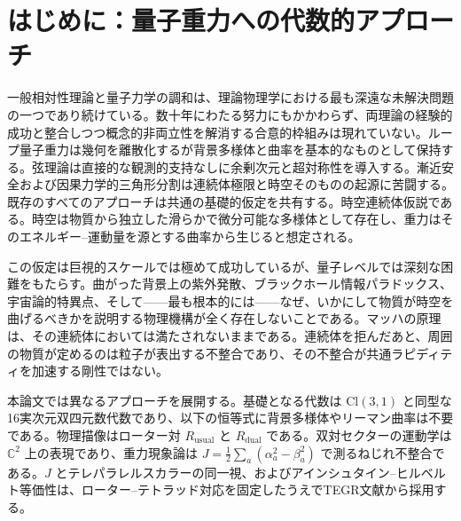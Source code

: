 \documentclass[a4paper]{article}
\begin{document}
\begin{abstract}
代数は動力学を定めない。等スケールの干渉節は内向きに並び、ボーア半径を再現しない。双対ローターの一周は、どの半径でも軌道上の点を元へ戻し、ローター自身を \(-1\) に置く。その戻りは運動量を含まない。物質波はド・ブロイ位相 \((Et-\mathbf{p}\cdot\mathbf{x})/\hbar\) であり、半径 \(n^{2}a_{0}\) へは閉じない。斥力層のスケールは電磁の長さである。書かれた反対符号の粒子作用は遅れを自由にし、共通ラピディティを源とする。角の不整合はその積であり、剛性が正ならば、零でない遅れは $-\infty$ へ走る。そのヤコビ積分は不定であり、調和剛性は振動数を復元せず、非整列も選ばない。質量の値、測定、経路積分は幾何的仮説として残り、代数の内部双対は十次元時空の超対称性ではない。
\end{abstract}

\section{はじめに：量子重力への代数的アプローチ}

一般相対性理論と量子力学の調和は、理論物理学における最も深遠な未解決問題の一つであり続けている。数十年にわたる努力にもかかわらず、両理論の経験的成功と整合しつつ概念的非両立性を解消する合意的枠組みは現れていない。ループ量子重力は幾何を離散化するが背景多様体と曲率を基本的なものとして保持する。弦理論は直接的な観測的支持なしに余剰次元と超対称性を導入する。漸近安全および因果力学的三角形分割は連続体極限と時空そのものの起源に苦闘する。既存のすべてのアプローチは共通の基礎的仮定を共有する。時空連続体仮説である。時空は物質から独立した滑らかで微分可能な多様体として存在し、重力はそのエネルギー--運動量を源とする曲率から生じると想定される。

この仮定は巨視的スケールでは極めて成功しているが、量子レベルでは深刻な困難をもたらす。曲がった背景上の紫外発散、ブラックホール情報パラドックス、宇宙論的特異点、そして——最も根本的には——なぜ、いかにして物質が時空を曲げるべきかを説明する物理機構が全く存在しないことである。マッハの原理は、その連続体においては満たされないままである。連続体を拒んだあと、周囲の物質が定めるのは粒子が表出する不整合であり、その不整合が共通ラピディティを加速する剛性ではない。

本論文では異なるアプローチを展開する。基礎となる代数は $\mathrm{Cl}(3,1)$ と同型な16実次元双四元数代数であり、以下の恒等式に背景多様体やリーマン曲率は不要である。物理描像はローター対 $R_\text{usual}$ と $R_\text{dual}$ である。双対セクターの運動学は $\mathbb{C}^2$ 上の表現であり、重力現象論は $J=\frac12\sum_a(\alpha_a^2-\beta_a^2)$ で測るねじれ不整合である。$J$ とテレパラレルスカラーの同一視、およびアインシュタイン--ヒルベルト等価性は、ローター–テトラッド対応を固定したうえでTEGR文献から採用する。
\end{document}
